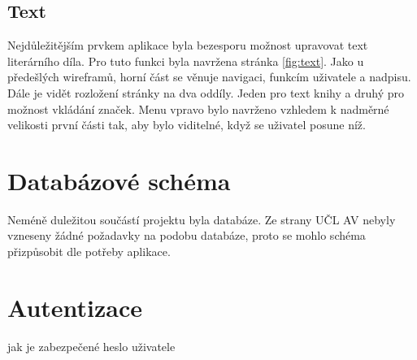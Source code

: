         \subsection{Text}
            Nejdůležitějším prvkem aplikace byla bezesporu možnost upravovat text literárního díla. Pro tuto funkci byla navržena stránka \ref{fig:text}. Jako u předešlých wireframů, horní část se věnuje navigaci, funkcím uživatele a nadpisu. Dále je vidět rozložení stránky na dva oddíly. Jeden pro text knihy a druhý pro možnost vkládání značek. Menu vpravo bylo navrženo vzhledem k nadměrné velikosti první části tak, aby bylo viditelné, když se uživatel posune níž.
            
    \section{Databázové schéma}
        Neméně duležitou součástí projektu byla databáze. Ze strany UČL AV nebyly vzneseny žádné požadavky na podobu databáze, proto se mohlo schéma přizpůsobit dle potřeby aplikace.
        
    \section{Autentizace}
        jak je zabezpečené heslo uživatele

